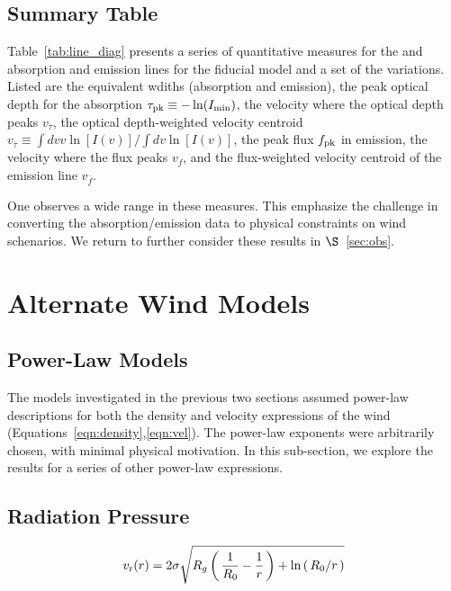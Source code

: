 \documentclass[12pt,preprint]{aastex}
\begin{document}
\subsection{Summary Table}

Table~\ref{tab:line_diag} presents a series of quantitative measures
for the  and  absorption and emission lines for
the fiducial model and a set of the variations.  Listed are the
equivalent wdiths (absorption and emission), the peak optical depth
for the absorption $\tau_{\rm pk} \equiv -\ln(I_{\rm min})$, the
velocity where the optical depth peaks $v_\tau$, the optical
depth-weighted velocity centroid $v_{\bar \tau} \equiv \int dv v
\ln[I(v)] / \int dv \ln[I(v)]$, the peak flux $f_{\rm pk}$ in
emission, the velocity where the flux peaks $v_f$, and the
flux-weighted velocity centroid of the emission line $v_{\bar f}$.

One observes a wide range in these measures.  This emphasize the
challenge in converting the absorption/emission data to physical
constraints on wind schenarios.  We return to further consider these
results in $\S$~\ref{sec:obs}.

\section{Alternate Wind Models}

\subsection{Power-Law Models}
\label{sec:power}

The models investigated in the previous two sections
assumed power-law descriptions for both the density and velocity
expressions of the wind (Equations~\ref{eqn:density},\ref{eqn:vel}).
The power-law exponents were arbitrarily chosen, with minimal physical
motivation.  In this sub-section, we explore the results for a series
of other power-law expressions.

\subsection{Radiation Pressure}

\begin{equation}
v_{\rm r}(r) = 2\sigma \sqrt{R_g \left ( \, \frac{1}{R_0} - \frac{1}{r} \, \right )
   + \ln\left ( \, R_0/r \, \right ) }
\end{equation}
\end{document}
